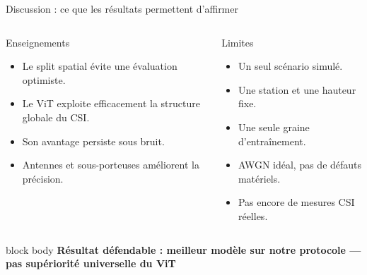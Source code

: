 \documentclass[aspectratio=169,10pt]{beamer}
\newcommand{\keybox}[1]{%
  \begin{beamercolorbox}[rounded=true,sep=0.7em,center]{block body}
    \textbf{\color{insatblue}#1}
  \end{beamercolorbox}%
}
\begin{document}
\begin{frame}{Discussion : ce que les résultats permettent d'affirmer}
  \begin{columns}[T,onlytextwidth]
      \begin{block}{Enseignements}
        \begin{itemize}
          \item Le split spatial évite une évaluation optimiste.
          \item Le ViT exploite efficacement la structure globale du CSI.
          \item Son avantage persiste sous bruit.
          \item Antennes et sous-porteuses améliorent la précision.
        \end{itemize}
      \end{block}

      \begin{block}{Limites}
        \begin{itemize}
          \item Un seul scénario simulé.
          \item Une station et une hauteur fixe.
          \item Une seule graine d'entraînement.
          \item AWGN idéal, pas de défauts matériels.
          \item Pas encore de mesures CSI réelles.
        \end{itemize}
      \end{block}
  \end{columns}
  \vspace{0.3cm}
  \keybox{Résultat défendable : meilleur modèle sur notre protocole --- pas supériorité universelle du ViT}
\end{frame}
\end{document}
